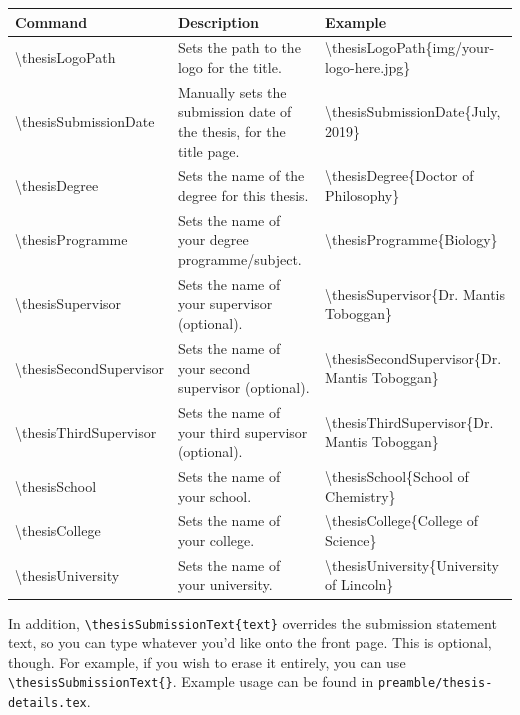 \vspace{1cm}
\begin{longtable}{l|p{1.3in}|l}
    \bfseries Command & \bfseries Description & \bfseries Example  \\ \hline
    \textbackslash thesisLogoPath & Sets the path to the logo for the title. & \textbackslash thesisLogoPath\{img/your-logo-here.jpg\}  \\
    \textbackslash thesisSubmissionDate & Manually sets the submission date of the thesis, for the title page. & \textbackslash thesisSubmissionDate\{July, 2019\}  \\
    \textbackslash thesisDegree & Sets the name of the degree for this thesis. & \textbackslash thesisDegree\{Doctor of Philosophy\}  \\
    \textbackslash thesisProgramme & Sets the name of your degree programme/subject. & \textbackslash thesisProgramme\{Biology\}  \\
    \textbackslash thesisSupervisor & Sets the name of your supervisor (optional). & \textbackslash thesisSupervisor\{Dr. Mantis Toboggan\}  \\
    \textbackslash thesisSecondSupervisor & Sets the name of your second supervisor (optional). & \textbackslash thesisSecondSupervisor\{Dr. Mantis Toboggan\}  \\
    \textbackslash thesisThirdSupervisor & Sets the name of your third supervisor (optional). & \textbackslash thesisThirdSupervisor\{Dr. Mantis Toboggan\}  \\
    \textbackslash thesisSchool & Sets the name of your school. & \textbackslash thesisSchool\{School of Chemistry\}  \\
    \textbackslash thesisCollege & Sets the name of your college. & \textbackslash thesisCollege\{College of Science\}  \\
    \textbackslash thesisUniversity & Sets the name of your university. & \textbackslash thesisUniversity\{University of Lincoln\}  \\
\end{longtable}

In addition, \texttt{\textbackslash thesisSubmissionText\{text\}} overrides the submission statement text, so you can type whatever you'd like onto the front page. This is optional, though. For example, if you wish to erase it entirely, you can use \texttt{\textbackslash thesisSubmissionText\{\}}. Example usage can be found in \texttt{preamble/thesis-details.tex}.






